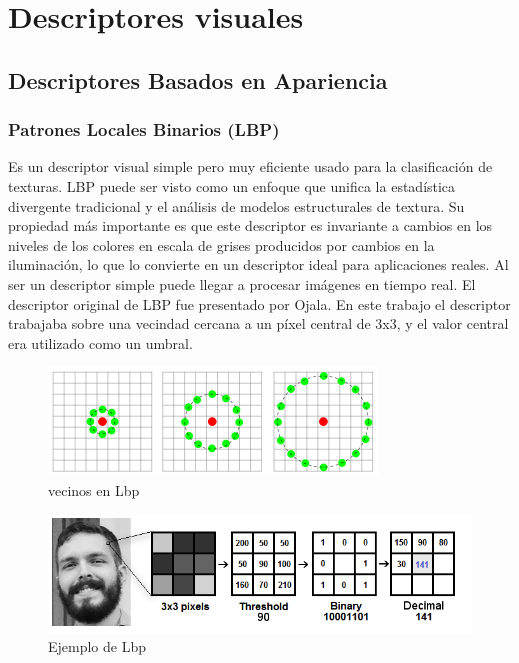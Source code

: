 \documentclass[a4paper,11pt]{report}
\begin{document}
\section{Descriptores visuales}
\subsection{Descriptores Basados en Apariencia}



\subsubsection{Patrones Locales Binarios (LBP)}
Es un descriptor visual simple pero muy eficiente usado para la clasificación de texturas. LBP puede ser visto como un enfoque que unifica la estadística divergente tradicional y el análisis de modelos estructurales de textura. Su propiedad más importante es que este descriptor es invariante a cambios en los niveles de los colores en escala de grises producidos por cambios en la iluminación, lo que lo convierte en un descriptor ideal para aplicaciones reales. Al ser un descriptor simple puede llegar a procesar imágenes en tiempo real.
El descriptor original de LBP fue presentado por Ojala. En este trabajo el descriptor trabajaba sobre una vecindad cercana a un píxel central de 3x3, y el valor central era utilizado como un umbral.

\begin{figure}[h]
	\centering
	\includegraphics[scale=0.8]{lbp}
	\caption{vecinos en Lbp}
	\label{fig:Vecinos en lbp}
\end{figure}

\newpage

\begin{figure}[h]
	\centering
	\includegraphics[scale=0.4]{lbpe}
	\caption{Ejemplo de  Lbp}
	\label{fig:Ejemplo}
\end{figure}
\end{document}
